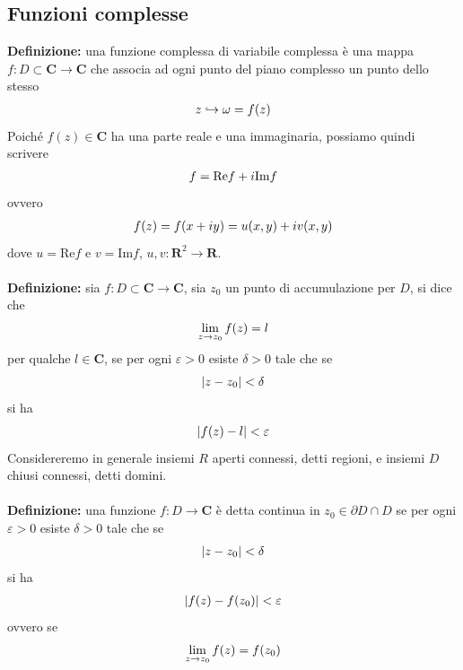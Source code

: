\documentclass{article}
\begin{document}
\subsection{Funzioni complesse}
\textbf{Definizione:} una funzione complessa di variabile complessa è una mappa $f : D \subset \mathbf{C} \longrightarrow \mathbf{C}$ che associa ad ogni punto del piano complesso un punto dello stesso
\begin{gather}
    z \hookrightarrow \omega = f(z) \notag
\end{gather}
Poiché $f(z) \in \mathbf{C}$ ha una parte reale e una immaginaria, possiamo quindi scrivere
\begin{gather}
    f = \mathrm{Re}f + i\mathrm{Im}f \notag
\end{gather}
ovvero
\begin{gather}
    f(z) = f(x + iy) = u(x, y) + iv(x, y) \notag
\end{gather}
dove $u = \mathrm{Re}f$ e $v = \mathrm{Im}f$, $u, v : \mathbf{R}^2 \longrightarrow \mathbf{R}$. \\ \\
\textbf{Definizione:} sia $f : D \subset \mathbf{C} \longrightarrow \mathbf{C}$, sia $z_0$ un punto di accumulazione per $D$, si dice che
\begin{gather}
    \lim_{z \rightarrow z_0}f(z) = l \notag
\end{gather}
per qualche $l \in \mathbf{C}$, se per ogni $\varepsilon > 0$ esiste $\delta > 0$ tale che se
\begin{gather}
    |z - z_0| < \delta \notag
\end{gather}
si ha
\begin{gather}
    |f(z) - l| < \varepsilon \notag
\end{gather}
Considereremo in generale insiemi $R$ aperti connessi, detti regioni, e insiemi $D$ chiusi connessi, detti domini. \\ \\
\textbf{Definizione:} una funzione $f : D \longrightarrow \mathbf{C}$ è detta continua in $z_0 \in \partial D \cap D$ se per ogni $\varepsilon > 0$ esiste $\delta > 0$ tale che se
\begin{gather}
    |z - z_0| < \delta \notag
\end{gather}
si ha
\begin{gather}
    |f(z) - f(z_0)| < \varepsilon \notag
\end{gather}
ovvero se
\begin{gather}
    \lim_{z \rightarrow z_0}f(z) = f(z_0) \notag
\end{gather}
\end{document}
